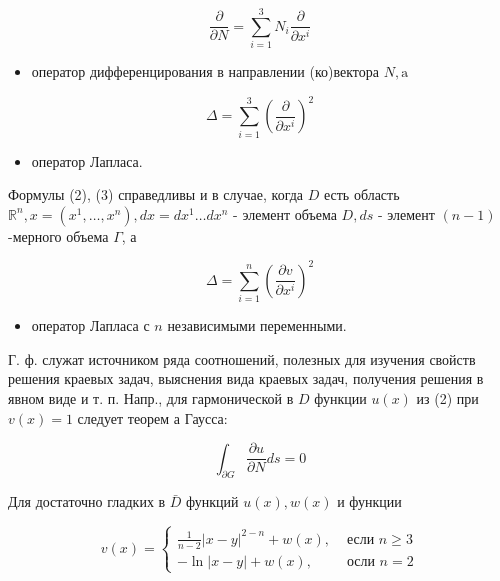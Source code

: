 \documentclass[10pt]{article}
\begin{document}
\[

\frac{\partial}{\partial N}=\sum_{i=1}^{3} N_{i} \frac{\partial}{\partial x^{i}}

\]



\begin{itemize}

  \item оператор дифференцирования в направлении (ко)вектора $N, \mathrm{a}$

\end{itemize}



\[

\Delta=\sum_{i=1}^{3}\left(\frac{\partial}{\partial x^{i}}\right)^{2}

\]



\begin{itemize}

  \item оператор Лапласа.

\end{itemize}



Формулы (2), (3) справедливы и в случае, когда $D$ есть область $\mathbb{R}^{n}, x=\left(x^{1}, \ldots, x^{n}\right), d x=d x^{1} \ldots d x^{n}$ - элемент объема $D, d s$ - элемент $(n-1)$-мерного объема $\Gamma$, а



\[

\Delta=\sum_{i=1}^{n}\left(\frac{\partial v}{\partial x^{i}}\right)^{2}

\]



\begin{itemize}

  \item оператор Лапласа с $n$ независимыми переменными.

\end{itemize}



Г. ф. служат источником ряда соотношений, полезных для изучения свойств решения краевых задач, выяснения вида краевых задач, получения решения в явном виде и т. п. Напр., для гармонической в $D$ функции $u(x)$ из (2) при $v(x)=1$ следует теорем а Гаусса:



\[

\int_{\partial G} \frac{\partial u}{\partial N} d s=0

\]



Для достаточно гладких в $\bar{D}$ функций $u(x), w(x)$ и функции



\[

v(x)= \begin{cases}\frac{1}{n-2}|x-y|^{2-n}+w(x), & \text { если } n \geqslant 3 \\ -\ln |x-y|+w(x), & \text { осли } n=2\end{cases}

\]
\end{document}

